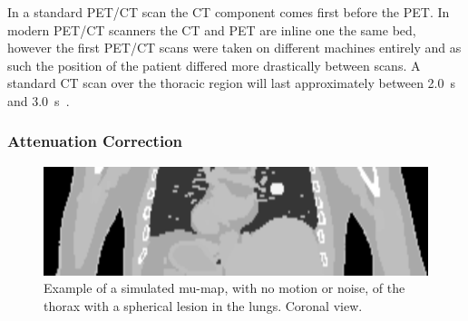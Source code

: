            In a standard \gls{PET}/\gls{CT} scan the \gls{CT} component comes first before the \gls{PET}. In modern \gls{PET}/\gls{CT} scanners the \gls{CT} and \gls{PET} are inline one the same bed, however the first \gls{PET}/\gls{CT} scans were taken on different machines entirely and as such the position of the patient differed more drastically between scans. A standard \gls{CT} scan over the thoracic region will last approximately between \SI{2.0}{\second} and \SI{3.0}{\second}~.
        
            \subsubsection{Attenuation Correction} \label{sec:attenuation_correction}
                \begin{figure}
                    \centering
                    
                    \includegraphics[width=1.0\linewidth]{figures/background_mu_map_example.png}
                    
                    \captionsetup{singlelinecheck=false, justification=raggedright}
                    \caption{Example of a simulated \gls{mu-map}, with no motion or noise, of the thorax with a spherical lesion in the lungs. Coronal view.} \label{fig:combined_pet_ct_mu_map_example}
                \end{figure}
                
